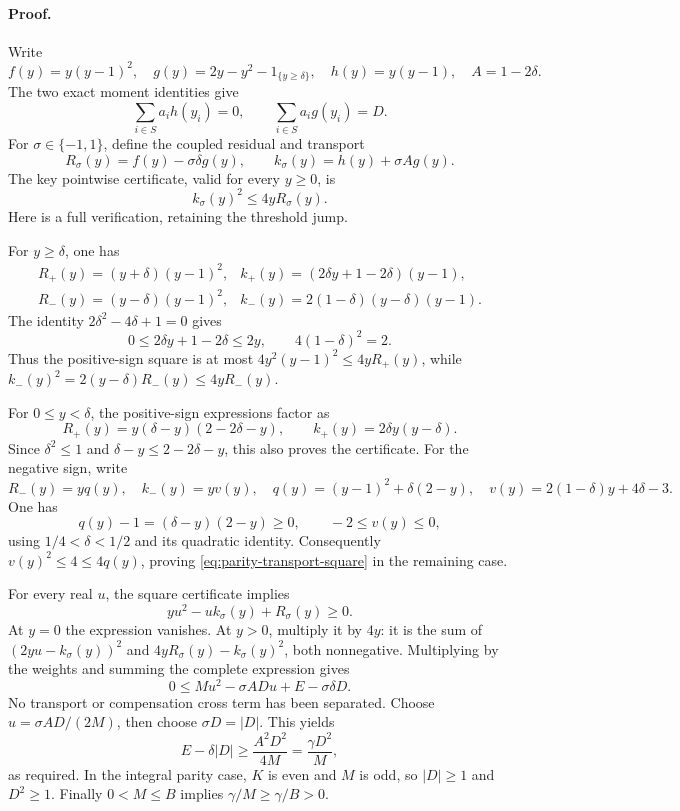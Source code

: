 \paragraph{Proof.}
Write
\[
 f(y)=y(y-1)^2,\quad
 g(y)=2y-y^2-1_{\{y\ge\delta\}},\quad
 h(y)=y(y-1),\quad A=1-2\delta.
\]
The two exact moment identities give
\[
 \sum_{i\in S}a_i h(y_i)=0,\qquad
 \sum_{i\in S}a_i g(y_i)=D.
\]
For \(\sigma\in\{-1,1\}\), define the coupled residual and transport
\[
 R_\sigma(y)=f(y)-\sigma\delta g(y),\qquad
 k_\sigma(y)=h(y)+\sigma A g(y).
\]
The key pointwise certificate, valid for every \(y\ge0\), is
\begin{equation}
 k_\sigma(y)^2\le4yR_\sigma(y).
 \label{eq:parity-transport-square}
\end{equation}
Here is a full verification, retaining the threshold jump.

For \(y\ge\delta\), one has
\[
 \begin{array}{ll}
 R_+(y)=(y+\delta)(y-1)^2,&
 k_+(y)=(2\delta y+1-2\delta)(y-1),\\
 R_-(y)=(y-\delta)(y-1)^2,&
 k_-(y)=2(1-\delta)(y-\delta)(y-1).
 \end{array}
\]
The identity \(2\delta^2-4\delta+1=0\) gives
\[
 0\le2\delta y+1-2\delta\le2y,\qquad
 4(1-\delta)^2=2.
\]
Thus the positive-sign square is at most
\(4y^2(y-1)^2\le4yR_+(y)\), while
\(k_-(y)^2=2(y-\delta)R_-(y)\le4yR_-(y)\).

For \(0\le y<\delta\), the positive-sign expressions factor as
\[
 R_+(y)=y(\delta-y)(2-2\delta-y),\qquad
 k_+(y)=2\delta y(y-\delta).
\]
Since \(\delta^2\le1\) and
\(\delta-y\le2-2\delta-y\), this also proves the certificate.
For the negative sign, write
\[
 R_-(y)=yq(y),\quad
 k_-(y)=yv(y),\quad
 q(y)=(y-1)^2+\delta(2-y),\quad
 v(y)=2(1-\delta)y+4\delta-3.
\]
One has
\[
 q(y)-1=(\delta-y)(2-y)\ge0,\qquad -2\le v(y)\le0,
\]
using \(1/4<\delta<1/2\) and its quadratic identity.
Consequently \(v(y)^2\le4\le4q(y)\), proving
\eqref{eq:parity-transport-square} in the remaining case.

For every real \(u\), the square certificate implies
\[
 yu^2-u k_\sigma(y)+R_\sigma(y)\ge0.
\]
At \(y=0\) the expression vanishes.  At \(y>0\), multiply it by
\(4y\): it is the sum of
\((2yu-k_\sigma(y))^2\) and
\(4yR_\sigma(y)-k_\sigma(y)^2\), both nonnegative.
Multiplying by the weights and summing the complete expression gives
\[
 0\le Mu^2-\sigma A D u+E-\sigma\delta D.
\]
No transport or compensation cross term has been separated.
Choose \(u=\sigma A D/(2M)\), then choose
\(\sigma D=|D|\).  This yields
\[
 E-\delta|D|\ge\frac{A^2D^2}{4M}
 =\frac{\gamma D^2}{M},
\]
as required.  In the integral parity case, \(K\) is even and \(M\)
is odd, so \(|D|\ge1\) and \(D^2\ge1\).  Finally
\(0<M\le B\) implies \(\gamma/M\ge\gamma/B>0\).

